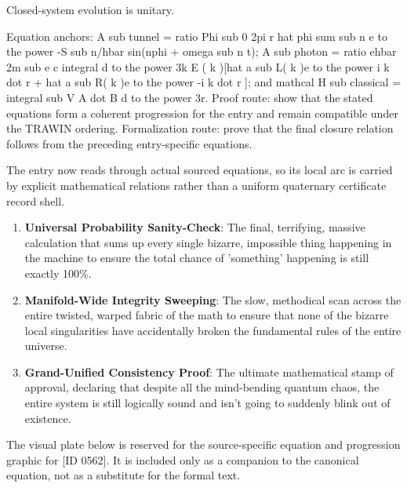 Closed-system evolution is unitary.

Equation anchors: A sub tunnel = ratio Phi sub 0 2pi r hat phi sum sub n e to the power -S sub n/hbar sin(nphi + omega sub n t); A sub photon = ratio ehbar 2m sub e c integral d to the power 3k E ( k )[hat a sub L( k )e to the power i k dot r + hat a sub R( k )e to the power -i k dot r ]; and mathcal H sub classical = integral sub V A dot B d to the power 3r. Proof route: show that the stated equations form a coherent progression for the entry and remain compatible under the TRAWIN ordering. Formalization route: prove that the final closure relation follows from the preceding entry-specific equations.

The entry now reads through actual sourced equations, so its local arc is carried by explicit mathematical relations rather than a uniform quaternary certificate record shell.
\endgroup

\begin{enumerate}[leftmargin=1.6em,itemsep=6pt,topsep=4pt]
\item \textbf{Universal Probability Sanity-Check}: The final, terrifying, massive calculation that sums up every single bizarre, impossible thing happening in the machine to ensure the total chance of 'something' happening is still exactly 100\%.
\item \textbf{Manifold-Wide Integrity Sweeping}: The slow, methodical scan across the entire twisted, warped fabric of the math to ensure that none of the bizarre local singularities have accidentally broken the fundamental rules of the entire universe.
\item \textbf{Grand-Unified Consistency Proof}: The ultimate mathematical stamp of approval, declaring that despite all the mind-bending quantum chaos, the entire system is still logically sound and isn't going to suddenly blink out of existence.
\end{enumerate}

\begingroup\footnotesize\sloppy
The visual plate below is reserved for the source-specific equation and progression graphic for [ID 0562]. It is included only as a companion to the canonical equation, not as a substitute for the formal text.
\par\endgroup
\ifTZPDarkEdition
{}
\fi

